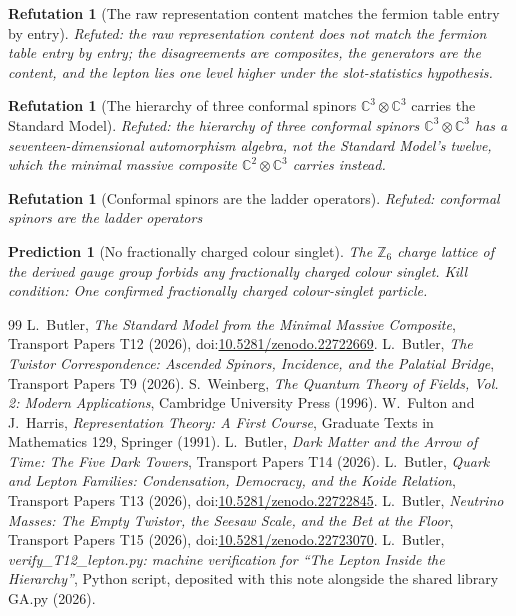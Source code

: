 \documentclass[11pt]{article}
\newtheorem{refutation}[theorem]{Refutation}
\newtheorem{prediction}[theorem]{Prediction}
\theoremstyle{definition}
\theoremstyle{plain}
\providecommand{\C}{}\renewcommand{\C}{\mathbb{C}}
\begin{document}
\begin{refutation}[The raw representation content matches the fermion table entry by entry]\label{c:refuted.the-raw-representation-content-matches-the-fermi}
Refuted: the raw representation content does not match the fermion table entry by entry; the disagreements are composites, the generators are the content, and the lepton lies one level higher under the slot-statistics hypothesis.
\end{refutation}

\begin{refutation}[The hierarchy of three conformal spinors $\mathbb{C}^{3}\otimes\mathbb{C}^{3}$ carries the Standard Model]\label{c:refuted.the-three-twistor-hierarchy-carries-the-standard}
Refuted: the hierarchy of three conformal spinors $\C^{3}\otimes\C^{3}$ has a seventeen-dimensional automorphism algebra, not the Standard Model's twelve, which the minimal massive composite $\C^{2}\otimes\C^{3}$ carries instead.
\end{refutation}

\begin{refutation}[Conformal spinors are the ladder operators]\label{c:refuted.twistors-are-the-ladder-operators}
Refuted: conformal spinors are the ladder operators
\end{refutation}

\begin{prediction}[No fractionally charged colour singlet]\label{c:pred.z6-charge-lattice}
The $\mathbb{Z}_{6}$ charge lattice of the derived gauge group forbids any fractionally charged colour singlet.
\emph{Kill condition:} One confirmed fractionally charged colour-singlet particle.
\end{prediction}

\begin{thebibliography}{99}
 L.~Butler,
\emph{The Standard Model from the Minimal Massive Composite},
Transport Papers T12 (2026), doi:\href{https://doi.org/10.5281/zenodo.22722669}{10.5281/zenodo.22722669}.
 L.~Butler,
\emph{The Twistor Correspondence: Ascended Spinors, Incidence, and the Palatial Bridge},
Transport Papers T9 (2026).
 S.~Weinberg,
\emph{The Quantum Theory of Fields, Vol. 2: Modern Applications},
Cambridge University Press (1996).
 W.~Fulton and J.~Harris,
\emph{Representation Theory: A First Course},
Graduate Texts in Mathematics 129, Springer (1991).
 L.~Butler,
\emph{Dark Matter and the Arrow of Time: The Five Dark Towers},
Transport Papers T14 (2026).
 L.~Butler,
\emph{Quark and Lepton Families: Condensation, Democracy, and the Koide Relation},
Transport Papers T13 (2026), doi:\href{https://doi.org/10.5281/zenodo.22722845}{10.5281/zenodo.22722845}.
 L.~Butler,
\emph{Neutrino Masses: The Empty Twistor, the Seesaw Scale, and the Bet at the Floor},
Transport Papers T15 (2026), doi:\href{https://doi.org/10.5281/zenodo.22723070}{10.5281/zenodo.22723070}.
 L.~Butler,
\emph{verify\_T12\_lepton.py: machine verification for ``The Lepton Inside the Hierarchy''},
Python script, deposited with this note alongside the shared library GA.py (2026).
\end{thebibliography}
\end{document}
